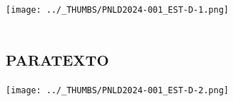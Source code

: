 \documentclass[%
			   12pt				%
			   ]{memoir}
\begin{document}
\texttt{[image: ../\_THUMBS/PNLD2024-001\_EST-D-1.png]}





{\begingroup\mbox{}\pagestyle{empty}
\pagestyle{empty} 
\pagebreak
\tableofcontents\clearpage\endgroup}



\theendnotes

\part{\textsc{paratexto}}


\texttt{[image: ../\_THUMBS/PNLD2024-001\_EST-D-2.png]}

\checkandfixthelayout
\end{document}
